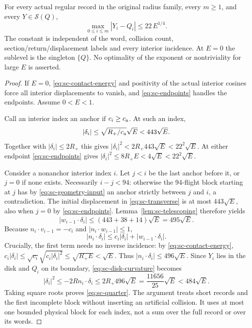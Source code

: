 \begin{sctheorem}\label{thm:sc-quarter}
For every actual regular record in the original radius family, every $m\ge1$, and every $Y\in\mathcal S(Q)$,
\begin{equation}\label{eq:sc-quarter}
 \max_{0\le i\le m}|Y_i-Q_i|\le22\,E^{1/4}.
\end{equation}
The constant is independent of the word, collision count, section/return/displacement labels and every interior incidence. At $E=0$ the sublevel is the singleton $\{Q\}$. No optimality of the exponent or nontriviality for large $E$ is asserted.
\end{sctheorem}
\begin{proof}
If $E=0$, \eqref{eq:sc-contact-energy} and positivity of the actual interior cosines force all interior displacements to vanish, and \eqref{eq:sc-endpoints} handles the endpoints. Assume $0<E<1$.

Call an interior index an anchor if $c_i\ge c_{\rm a}$. At such an index,
\[
 |\delta_i|\le\sqrt{R_+/c_{\rm a}}\sqrt E<443\sqrt E.
\]
Together with $|\delta_i|\le2R_+$ this gives
$|\delta_i|^2<2R_+443\sqrt E<22^2\sqrt E$.
At either endpoint \eqref{eq:sc-endpoints} gives
$|\delta_i|^2\le8R_+E<4\sqrt E<22^2\sqrt E$.

Consider a nonanchor interior index $i$. Let $j<i$ be the last anchor before it, or $j=0$ if none exists. Necessarily $i-j<94$: otherwise the 94-flight block starting at $j$ has by \eqref{eq:sc-geometry-input} an anchor strictly between $j$ and $i$, a contradiction. The initial displacement in \eqref{eq:sc-transverse} is at most $443\sqrt E$, also when $j=0$ by \eqref{eq:sc-endpoints}. Lemma~\ref{lem:sc-telescoping} therefore yields
\[
 |w_{i-1}\cdot\delta_i|\le(443+38+14)\sqrt E=495\sqrt E.
\]
Because $n_i\cdot v_{i-1}=-c_i$ and $|n_i\cdot w_{i-1}|\le1$,
\[
 |n_i\cdot\delta_i|\le c_i|\delta_i|+|w_{i-1}\cdot\delta_i|.
\]
Crucially, the first term needs no inverse incidence: by \eqref{eq:sc-contact-energy},
$c_i|\delta_i|\le\sqrt{c_i}\sqrt{c_i|\delta_i|^2}\le\sqrt{R_+E}<\sqrt E$.
Thus $|n_i\cdot\delta_i|\le496\sqrt E$. Since $Y_i$ lies in the disk and $Q_i$ on its boundary, \eqref{eq:sc-disk-curvature} becomes
\[
 |\delta_i|^2\le-2R n_i\cdot\delta_i
 \le2R_+496\sqrt E=\frac{11656}{25}\sqrt E
 <484\sqrt E.
\]
Taking square roots proves \eqref{eq:sc-quarter}. The argument treats short records and the first incomplete block without inserting an artificial collision. It uses at most one bounded physical block for each index, not a sum over the full record or over its words.
\end{proof}

